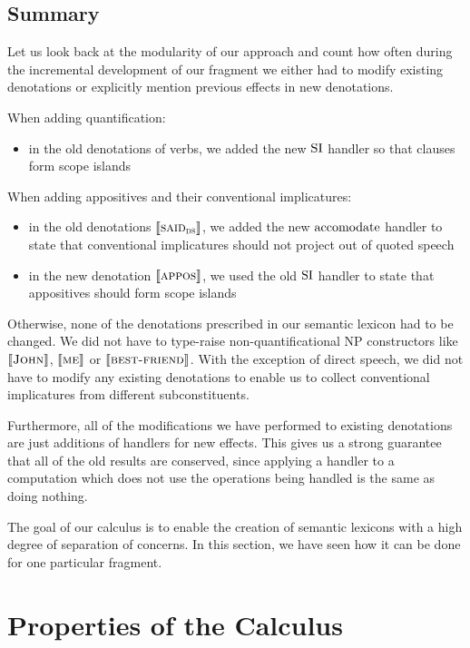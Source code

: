 \documentclass{llncs}
\begin{document}
\subsection{Summary}

Let us look back at the modularity of our approach and count how often
during the incremental development of our fragment we either had to modify
existing denotations or explicitly mention previous effects in new
denotations.

When adding quantification:
\begin{itemize}
\item in the old denotations of verbs, we added the new $\operatorname{SI}$ handler so
  that clauses form scope islands
\end{itemize}

When adding appositives and their conventional implicatures:
\begin{itemize}
\item in the old denotations $\llbracket \textsc{said}_{\textsc{ds}} \rrbracket$, we added the new
  $\operatorname{accomodate}$ handler to state that conventional implicatures should not
  project out of quoted speech
\item in the new denotation $\llbracket \textsc{appos} \rrbracket$, we used the old $\operatorname{SI}$
  handler to state that appositives should form scope islands
\end{itemize}

Otherwise, none of the denotations prescribed in our semantic lexicon had
to be changed. We did not have to type-raise non-quantificational NP
constructors like $\llbracket \textsc{John} \rrbracket$, $\llbracket \textsc{me} \rrbracket$ or
$\llbracket \textsc{best-friend} \rrbracket$. With the exception of direct speech, we did not
have to modify any existing denotations to enable us to collect
conventional implicatures from different subconstituents.

Furthermore, all of the modifications we have performed to existing
denotations are just additions of handlers for new effects. This gives us a
strong guarantee that all of the old results are conserved, since applying
a handler to a computation which does not use the operations being handled
is the same as doing nothing.

The goal of our calculus is to enable the creation of semantic lexicons
with a high degree of separation of concerns. In this section, we have seen
how it can be done for one particular fragment.


\section{Properties of the Calculus}
\label{sec:properties}
\end{document}
